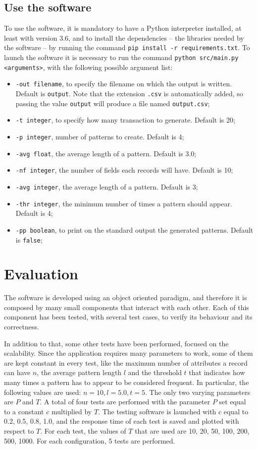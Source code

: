 \documentclass{acm_proc_article-sp-sigmod09}
\begin{document}
\subsection{Use the software}
To use the software, it is mandatory to have a Python interpreter installed, at least with version 3.6, and to install the dependencies -- the libraries needed by the software -- by running the command \texttt{pip install -r requirements.txt}. To launch the software it is necessary to run the command \texttt{python src/main.py <arguments>}, with the following possible argument list:
\begin{itemize}
\item \texttt{-out filename}, to specify the filename on which the output is written. Default is \texttt{output}. Note that the extension \texttt{.csv} is automatically added, so passing the value \texttt{output} will produce a file named \texttt{output.csv};
\item \texttt{-t integer}, to specify how many transaction to generate. Default is 20;
\item \texttt{-p integer}, number of patterns to create. Default is 4;
\item \texttt{-avg float}, the average length of a pattern. Default is 3.0;
\item \texttt{-nf integer}, the number of fields each records will have. Default is 10;
\item \texttt{-avg integer}, the average length of a pattern. Default is 3;
\item \texttt{-thr integer}, the minimum number of times a pattern should appear. Default is 4;
\item \texttt{-pp boolean}, to print on the standard output the generated patterns. Default is \texttt{false};
\end{itemize}

\section{Evaluation}
The software is developed using an object oriented paradigm, and therefore it is composed by many small components that interact with each other. Each of this component has been tested, with several test cases, to verify its behaviour and its correctness.

In addition to that, some other tests have been performed, focused on the scalability. Since the application requires many parameters to work, some of them are kept constant in every test, like the maximum number of attributes a record can have $n$, the average pattern length $l$ and the threshold $t$ that indicates how many times a pattern has to appear to be considered frequent. In particular, the following values are used: $n = 10, l = 5.0, t = 5$. The only two varying parameters are $P$ and $T$. A total of four tests are performed with the parameter $P$ set equal to a constant $c$ multiplied by $T$. The testing software is launched with $c$ equal to 0.2, 0.5, 0.8, 1.0, and the response time of each test is saved and plotted with respect to $T$. For each test, the values of $T$ that are used are 10, 20, 50, 100, 200, 500, 1000. For each configuration, 5 tests are performed.
\end{document}
